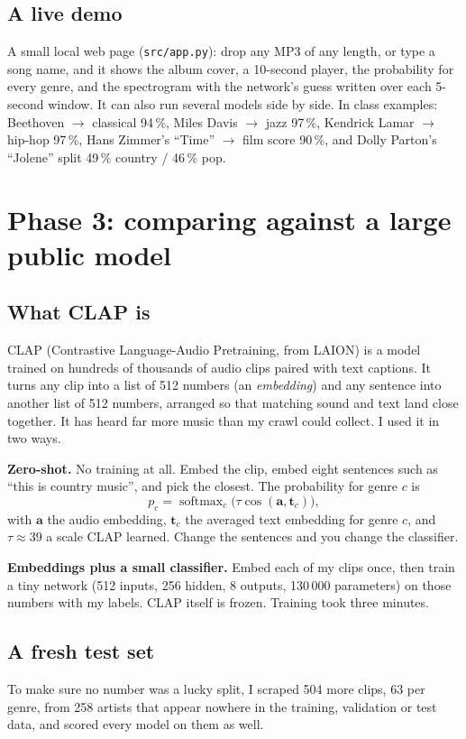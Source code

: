 \documentclass[11pt]{article}
\begin{document}
\subsection{A live demo}
A small local web page (\texttt{src/app.py}): drop any MP3 of any length, or type a song name, and it shows the album cover, a 10-second player, the probability for every genre, and the spectrogram with the network's guess written over each 5-second window. It can also run several models side by side. In class examples: Beethoven $\to$ classical 94\,\%, Miles Davis $\to$ jazz 97\,\%, Kendrick Lamar $\to$ hip-hop 97\,\%, Hans Zimmer's ``Time'' $\to$ film score 90\,\%, and Dolly Parton's ``Jolene'' split 49\,\% country / 46\,\% pop.

\section{Phase 3: comparing against a large public model}\label{sec:clap}

\subsection{What CLAP is}
CLAP (Contrastive Language-Audio Pretraining, from LAION) is a model trained on hundreds of thousands of audio clips paired with text captions. It turns any clip into a list of 512 numbers (an \emph{embedding}) and any sentence into another list of 512 numbers, arranged so that matching sound and text land close together. It has heard far more music than my crawl could collect. I used it in two ways.

\textbf{Zero-shot.} No training at all. Embed the clip, embed eight sentences such as ``this is country music'', and pick the closest. The probability for genre $c$ is
\[
p_c = \operatorname{softmax}_c\big(\tau\cos(\mathbf{a},\mathbf{t}_c)\big),
\]
with $\mathbf{a}$ the audio embedding, $\mathbf{t}_c$ the averaged text embedding for genre $c$, and $\tau\approx39$ a scale CLAP learned. Change the sentences and you change the classifier.

\textbf{Embeddings plus a small classifier.} Embed each of my clips once, then train a tiny network (512 inputs, 256 hidden, 8 outputs, 130\,000 parameters) on those numbers with my labels. CLAP itself is frozen. Training took three minutes.

\subsection{A fresh test set}
To make sure no number was a lucky split, I scraped 504 more clips, 63 per genre, from 258 artists that appear nowhere in the training, validation or test data, and scored every model on them as well.
\end{document}
